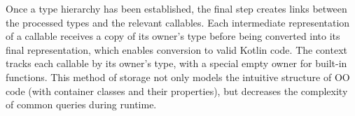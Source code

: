 Once a type hierarchy has been established, the final step creates links between the
processed types and the relevant callables.
Each intermediate representation of a callable receives a copy of its owner's type
before being converted into its final representation, which enables conversion to
valid Kotlin code.
The context tracks each callable by its owner's type, with a special empty owner for built-in 
functions.
This method of storage not only models the intuitive structure of \Gls{OO} code 
(with container classes and their properties), but decreases the complexity of
common queries during runtime.

